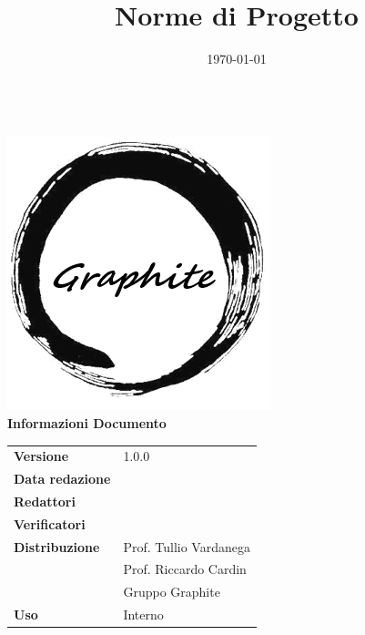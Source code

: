\documentclass[openany,12pt,a4paper]{report}
\title{Norme di Progetto}
\author{}
\date{\today}
\begin{document}
	\makeatletter
	\begin{titlepage}
		\setlength{\headsep}{0pt}  
		\begin{center}
			{\huge \bfseries  \@title }\\[10ex]
			\includegraphics[width=0.5\linewidth]{logo.png}\\[1em]
			\textbf{\Large Informazioni Documento} \\[2em]
			\bgroup
			\def\arraystretch{1.5}
			\begin{tabular}{l|l}
				\textbf{Versione} & 1.0.0 \\
				\textbf{Data redazione} & \large \@date \\
				\textbf{Redattori} &  \\
				\textbf{Verificatori} &  \\
				\textbf{Distribuzione} & Prof. Tullio Vardanega \\
				 & Prof. Riccardo Cardin \\
				 & Gruppo Graphite \\
				\textbf{Uso} & Interno \\
			\end{tabular}
		\egroup
		\end{center}
	\end{titlepage}
	\makeatother

	\thispagestyle{empty}
	\newpage
	\tableofcontents
	
	
	
	
	
	
	
	
\end{document}
